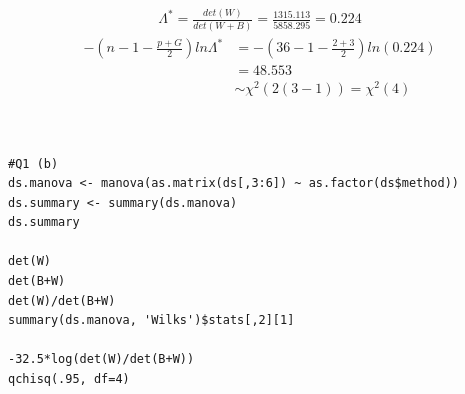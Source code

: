 \documentclass[12pt]{article}
\newenvironment{solution}[2][Solution]{\begin{trivlist}
\item[\hskip \labelsep {\bfseries #1}\hskip \labelsep {\bfseries #2.}]}{\end{trivlist}}
\begin{document}
\begin{solution}[(b) Solution] \\ 
\begin{align*}
    \Lambda^* = \frac{det(W)}{det(W+B)} = \frac{1315.113}{5858.295} = 0.224
\end{align*}
\begin{align*}
    -\left( n-1-\frac{p+G}{2} \right)ln \Lambda^* &= -\left( 36-1-\frac{2+3}{2} \right)ln(0.224)\\
    &= 48.553\\
    &\sim \chi^2 (2(3-1)) = \chi^2 (4)
\end{align*}
\\
\ \\

\begin{lstlisting}[caption=R code for Q1 (b)]
#Q1 (b)
ds.manova <- manova(as.matrix(ds[,3:6]) ~ as.factor(ds$method))
ds.summary <- summary(ds.manova)
ds.summary

det(W)
det(B+W)
det(W)/det(B+W)
summary(ds.manova, 'Wilks')$stats[,2][1]

-32.5*log(det(W)/det(B+W))
qchisq(.95, df=4)
\end{lstlisting}
\end{solution}
\end{document}
